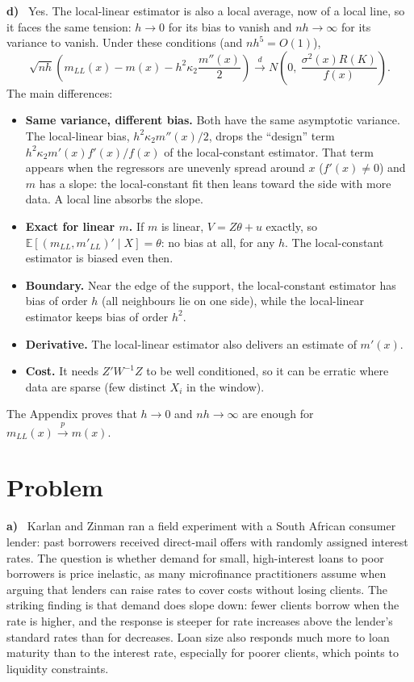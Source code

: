 \documentclass[11pt]{article}
\newcommand{\E}{\mathbb{E}}
\theoremstyle{plain}
\newcounter{problem}
\renewcommand{\theproblem}{\arabic{problem}}
\newcommand{\problem}{
	\stepcounter{problem}
	\section*{Problem \theproblem}
}
\newcommand{\itm}[1]{\par\textbf{#1)}\ }
\begin{document}
\itm{d}
Yes. The local-linear estimator is also a local average, now of a local line, so it faces the same tension: $h\to 0$ for its bias to vanish and $nh\to\infty$ for its variance to vanish. Under these conditions (and $nh^5=O(1)$),
\[
\sqrt{nh}\left(m_{LL}(x) - m(x) - h^2\kappa_2\frac{m''(x)}{2}\right)\xrightarrow{d} N\left(0,\ \frac{\sigma^2(x)R(K)}{f(x)}\right).
\]
The main differences:
\begin{itemize}
	\item \textbf{Same variance, different bias.} Both have the same asymptotic variance. The local-linear bias, $h^2\kappa_2 m''(x)/2$, drops the ``design'' term $h^2\kappa_2 m'(x)f'(x)/f(x)$ of the local-constant estimator. That term appears when the regressors are unevenly spread around $x$ ($f'(x)\ne 0$) and $m$ has a slope: the local-constant fit then leans toward the side with more data. A local line absorbs the slope.
	\item \textbf{Exact for linear $m$.} If $m$ is linear, $V = Z\theta + u$ exactly, so $\E[(m_{LL},m'_{LL})'\mid X] = \theta$: no bias at all, for any $h$. The local-constant estimator is biased even then.
	\item \textbf{Boundary.} Near the edge of the support, the local-constant estimator has bias of order $h$ (all neighbours lie on one side), while the local-linear estimator keeps bias of order $h^2$.
	\item \textbf{Derivative.} The local-linear estimator also delivers an estimate of $m'(x)$.
	\item \textbf{Cost.} It needs $Z'W^{-1}Z$ to be well conditioned, so it can be erratic where data are sparse (few distinct $X_i$ in the window).
\end{itemize}
The Appendix proves that $h\to 0$ and $nh\to\infty$ are enough for $m_{LL}(x)\xrightarrow{p}m(x)$.

\problem

\itm{a}
Karlan and Zinman ran a field experiment with a South African consumer lender: past borrowers received direct-mail offers with randomly assigned interest rates. The question is whether demand for small, high-interest loans to poor borrowers is price inelastic, as many microfinance practitioners assume when arguing that lenders can raise rates to cover costs without losing clients. The striking finding is that demand does slope down: fewer clients borrow when the rate is higher, and the response is steeper for rate increases above the lender's standard rates than for decreases. Loan size also responds much more to loan maturity than to the interest rate, especially for poorer clients, which points to liquidity constraints.
\end{document}
